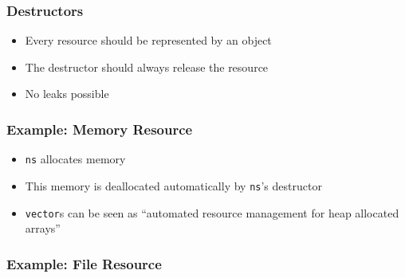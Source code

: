 \documentclass{../ucll-slides}
\begin{document}
\begin{frame}
  \frametitle{Destructors}
  \begin{itemize}
    \item Every resource should be represented by an object
    \item The destructor should always release the resource
    \item No leaks possible
  \end{itemize}
\end{frame}

\begin{frame}
  \frametitle{Example: Memory Resource}
  \begin{itemize}
    \item {\tt ns} allocates memory
    \item This memory is deallocated automatically by {\tt ns}'s destructor
    \item {\tt vector}s can be seen as ``automated resource management for heap allocated arrays''
  \end{itemize}
\end{frame}

\begin{frame}
  \frametitle{Example: File Resource}
\end{frame}
\end{document}
